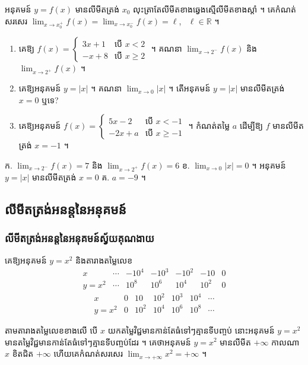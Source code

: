 \begin{formulaBox}[ជាទូទៅ]
អនុគមន៍ $y = f(x)$ មានលីមីតត្រង់ $x_0$ លុះត្រាតែលីមីតខាងឆ្វេងស្មើលីមីតខាងស្ដាំ ។ គេកំណត់សរសេរ $\displaystyle\lim_{x \to x_0^+} f(x) = \lim_{x \to x_0^-} f(x) = \ell$, \ $\ell \in \mathbb{R}$ ។
\end{formulaBox}

\begin{pro}
\begin{enumerate}[a]
  \item គេឱ្យ $f(x) = \begin{cases} 3x + 1 & \text{បើ } x < 2\\ -x + 8 & \text{បើ } x \ge 2 \end{cases}$ ។ គណនា $\displaystyle\lim_{x \to 2^-} f(x)$ និង $\displaystyle\lim_{x \to 2^+} f(x)$ ។
  \item គេឱ្យអនុគមន៍ $y = |x|$ ។ គណនា $\displaystyle\lim_{x \to 0}|x|$ ។ តើអនុគមន៍ $y = |x|$ មានលីមីតត្រង់ $x = 0$ ឬទេ?
  \item គេឱ្យអនុគមន៍ $f(x) = \begin{cases} 5x - 2 & \text{បើ } x < -1\\ -2x + a & \text{បើ } x \ge -1 \end{cases}$ ។ កំណត់តម្លៃ $a$ ដើម្បីឱ្យ $f$ មានលីមីតត្រង់ $x = -1$ ។
\end{enumerate}
\ans
ក. $\displaystyle\lim_{x \to 2^-} f(x) = 7$ និង $\displaystyle\lim_{x \to 2^+} f(x) = 6$ \quad ខ. $\displaystyle\lim_{x \to 0}|x| = 0$ ។ អនុគមន៍ $y = |x|$ មានលីមីតត្រង់ $x = 0$ \quad គ. $a = -9$ ។
\end{pro}

\subsection{លីមីតត្រង់អនន្តនៃអនុគមន៍}
\subsubsection{លីមីតត្រង់អនន្តនៃអនុគមន៍ស្វ័យគុណងាយ}

\begin{example}[ឧទាហរណ៍ ១]
គេឱ្យអនុគមន៍ $y = x^2$ និងតារាងតម្លៃលេខ
\[
\begin{array}{c|cccccc}
x & \cdots & -10^4 & -10^3 & -10^2 & -10 & 0\\ \hline
y = x^2 & \cdots & 10^8 & 10^6 & 10^4 & 10^2 & 0
\end{array}
\]
\[
\begin{array}{c|cccccc}
x & 0 & 10 & 10^2 & 10^3 & 10^4 & \cdots\\ \hline
y = x^2 & 0 & 10^2 & 10^4 & 10^6 & 10^8 & \cdots
\end{array}
\]
\end{example}
តាមតារាងតម្លៃលេខខាងលើ បើ $x$ យកតម្លៃវិជ្ជមានកាន់តែធំទៅៗគ្មានទីបញ្ចប់ នោះអនុគមន៍ $y = x^2$ មានតម្លៃវិជ្ជមានកាន់តែធំទៅៗគ្មានទីបញ្ចប់ដែរ ។ គេថាអនុគមន៍ $y = x^2$ មានលីមីត $+\infty$ កាលណា $x$ ខិតជិត $+\infty$ ហើយគេកំណត់សរសេរ $\displaystyle\lim_{x \to +\infty} x^2 = +\infty$ ។

